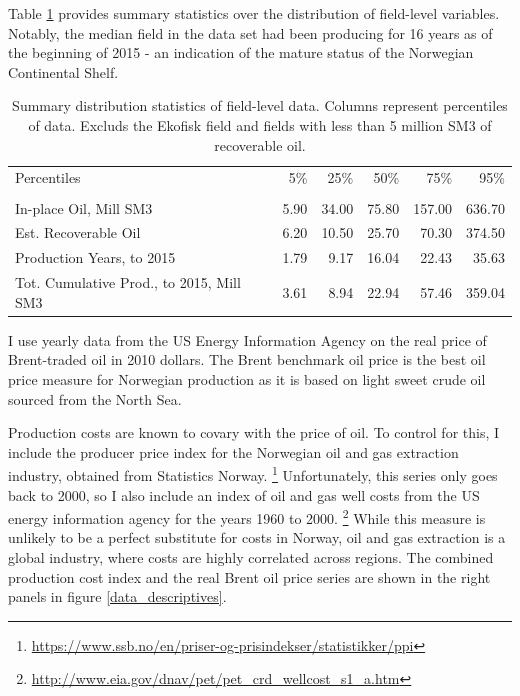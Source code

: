 \documentclass[12pt]{article}
\begin{document}
Table \ref{field_summary} provides summary statistics over the distribution of field-level variables. Notably, the median field in the data set had been producing for 16 years as of the beginning of 2015 - an indication of the mature status of the Norwegian Continental Shelf. 

\begin{table}
\begin{tabular}{lrrrrr}
\toprule
Percentiles &    5\% &    25\% &    50\% &     75\% &     95\% \\
                      &       &        &        &         &         \\
\midrule
In-place Oil, Mill SM3         &  5.90 &  34.00 &  75.80 &  157.00 &  636.70 \\
Est. Recoverable Oil           &  6.20 &  10.50 &  25.70 &   70.30 &  374.50 \\
Production Years, to 2015      &  1.79 &   9.17 &  16.04 &   22.43 &   35.63 \\
Tot. Cumulative Prod., to 2015, Mill SM3 &  3.61 &   8.94 &  22.94 &   57.46 &  359.04 \\
\bottomrule
\end{tabular}
\caption{Summary distribution statistics of field-level data. Columns represent percentiles of data. Excluds the Ekofisk field and fields with less than 5 million SM3 of recoverable oil.}
\label{field_summary}
\end{table}

I use yearly data from the US Energy Information Agency on the real price of Brent-traded oil in 2010 dollars. The Brent benchmark oil price is the best oil price measure for Norwegian production as it is based on light sweet crude oil sourced from the North Sea.  

Production costs are known to covary with the price of oil.  To control for this, I include the producer price index for the Norwegian oil and gas extraction industry, obtained from Statistics Norway. \footnote{\url{https://www.ssb.no/en/priser-og-prisindekser/statistikker/ppi}} Unfortunately, this series only goes back to 2000, so I also include an index of oil and gas well costs from the US energy information agency for the years 1960 to 2000.  \footnote{\url{http://www.eia.gov/dnav/pet/pet_crd_wellcost_s1_a.htm}} While this measure is unlikely to be a perfect substitute for costs in Norway, oil and gas extraction is a global industry, where costs are highly correlated across regions. The combined production cost index and the real Brent oil price series are shown in the right panels in figure \ref{data_descriptives}.
\end{document}
